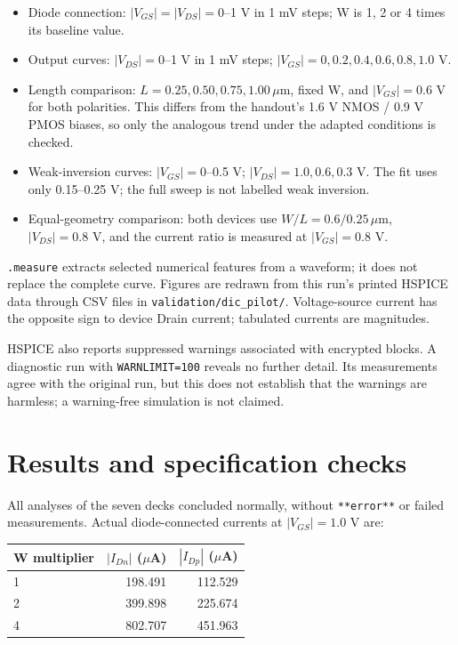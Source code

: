 \begin{itemize}
\item Diode connection: $|V_{GS}|=|V_{DS}|=0$--1 V in 1 mV steps; W is 1, 2 or 4 times its baseline value.
\item Output curves: $|V_{DS}|=0$--1 V in 1 mV steps; $|V_{GS}|=0,0.2,0.4,0.6,0.8,1.0$ V.
\item Length comparison: $L=0.25,0.50,0.75,1.00\,\mu\mathrm m$, fixed W, and $|V_{GS}|=0.6$ V for both polarities. This differs from the handout's 1.6 V NMOS / 0.9 V PMOS biases, so only the analogous trend under the adapted conditions is checked.
\item Weak-inversion curves: $|V_{GS}|=0$--0.5 V; $|V_{DS}|=1.0,0.6,0.3$ V. The fit uses only 0.15--0.25 V; the full sweep is not labelled weak inversion.
\item Equal-geometry comparison: both devices use $W/L=0.6/0.25\,\mu\mathrm m$, $|V_{DS}|=0.8$ V, and the current ratio is measured at $|V_{GS}|=0.8$ V.
\end{itemize}
\texttt{.measure} extracts selected numerical features from a waveform; it does not replace the complete curve. Figures are redrawn from this run's printed HSPICE data through CSV files in \texttt{validation/dic\_pilot/}. Voltage-source current has the opposite sign to device Drain current; tabulated currents are magnitudes.

HSPICE also reports suppressed warnings associated with encrypted blocks. A diagnostic run with \texttt{WARNLIMIT=100} reveals no further detail. Its measurements agree with the original run, but this does not establish that the warnings are harmless; a warning-free simulation is not claimed.

\section{Results and specification checks}
All analyses of the seven decks concluded normally, without \texttt{**error**} or failed measurements. Actual diode-connected currents at $|V_{GS}|=1.0$ V are:
\begin{center}
\setlength{\tabcolsep}{3pt}
\begin{tabular}{lrr}
\toprule
W multiplier & $|I_{Dn}|$ ($\mu$A) & $|I_{Dp}|$ ($\mu$A) \\
\midrule
1 & 198.491 & 112.529 \\
2 & 399.898 & 225.674 \\
4 & 802.707 & 451.963 \\
\bottomrule
\end{tabular}
\end{center}

